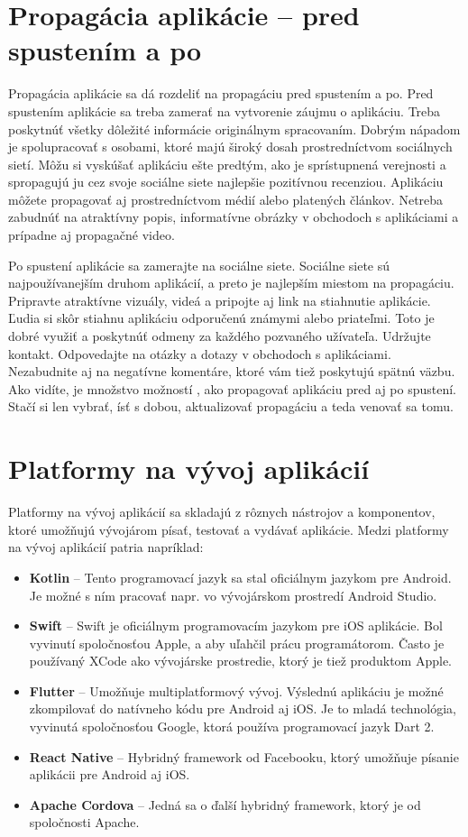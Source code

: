 \documentclass[10pt,twoside,slovak,a4paper]{article}
\begin{document}
\section{Propagácia aplikácie – pred spustením a po}
\quad Propagácia aplikácie sa dá rozdeliť na propagáciu pred spustením a po. Pred spustením aplikácie sa treba zamerať na vytvorenie záujmu o aplikáciu. Treba poskytnúť všetky dôležité informácie originálnym spracovaním. Dobrým nápadom je spolupracovať s osobami, ktoré majú široký dosah prostredníctvom sociálnych sietí. Môžu si vyskúšať aplikáciu ešte predtým, ako je sprístupnená verejnosti a spropagujú ju cez svoje sociálne siete najlepšie pozitívnou recenziou. Aplikáciu môžete propagovať aj prostredníctvom médií alebo platených článkov. Netreba zabudnúť na atraktívny popis, informatívne obrázky v obchodoch s aplikáciami a prípadne aj propagačné video.

Po spustení aplikácie sa zamerajte na sociálne siete. Sociálne siete sú najpoužívanejším druhom aplikácií, a preto je najlepším miestom na propagáciu. Pripravte atraktívne vizuály, videá a pripojte aj link na stiahnutie aplikácie. Ľudia si skôr stiahnu aplikáciu odporučenú známymi alebo priateľmi. Toto je dobré využiť a poskytnúť odmeny za každého pozvaného užívateľa. Udržujte kontakt. Odpovedajte na otázky a dotazy v obchodoch s aplikáciami. Nezabudnite aj na negatívne komentáre, ktoré vám tiež poskytujú spätnú väzbu. Ako vidíte, je množstvo možností , ako propagovať aplikáciu pred aj po spustení. Stačí si len vybrať, ísť s dobou, aktualizovať propagáciu a teda venovať sa tomu.



\section{Platformy na vývoj aplikácií}
\quad Platformy na vývoj aplikácií sa skladajú z rôznych nástrojov a komponentov, ktoré umožňujú vývojárom písať, testovať a vydávať aplikácie. Medzi platformy na vývoj aplikácií patria napríklad:
\begin{itemize}
\item \textbf{Kotlin} – Tento programovací jazyk sa stal oficiálnym jazykom pre Android. Je možné s ním pracovať napr. vo vývojárskom prostredí Android Studio.
\item \textbf{Swift} – Swift je oficiálnym programovacím jazykom pre iOS aplikácie. Bol vyvinutí spoločnosťou Apple, a aby uľahčil prácu programátorom. Často je používaný XCode ako vývojárske prostredie, ktorý je tiež produktom Apple.
\item \textbf{Flutter} – Umožňuje multiplatformový vývoj. Výslednú aplikáciu je možné zkompilovať do natívneho kódu pre Android aj iOS. Je to mladá technológia, vyvinutá spoločnosťou Google, ktorá používa programovací jazyk Dart 2.
\item \textbf{React Native} – Hybridný framework od Facebooku, ktorý umožňuje písanie aplikácii pre Android aj iOS.
\item \textbf{Apache Cordova} – Jedná sa o ďalší hybridný framework, ktorý je od spoločnosti Apache.
\end{itemize}
\end{document}
